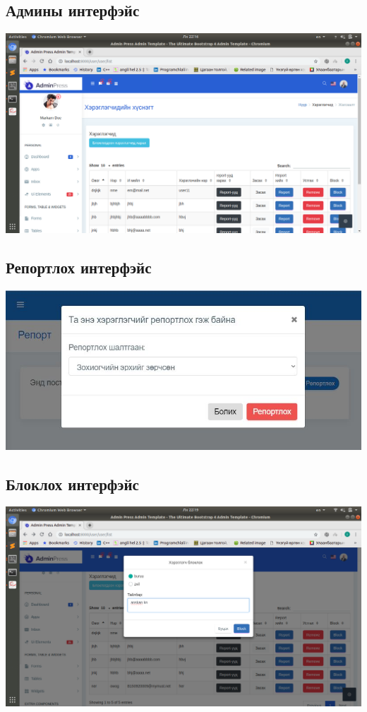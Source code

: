 \documentclass[
oneside, %
english, %
onehalfspacing, %
nolistspacing, %
headsepline, %
]{article} %
\begin{document}
     \subsection{Админы интерфэйс}
     \includegraphics[width=\textwidth]{delgets1}
      \subsection{Репортлох интерфэйс}
     \includegraphics[width=\textwidth]{delgets2}
     \subsection{ Блоклох интерфэйс}
     \includegraphics[width=\textwidth]{delgets3}
\end{document}

